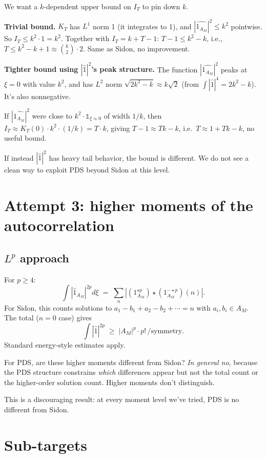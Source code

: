 \documentclass[11pt]{article}
\begin{document}
We want a $k$-dependent upper bound on $I_T$ to pin down $k$.

\textbf{Trivial bound.} $K_T$ has $L^1$ norm 1 (it integrates to 1), and
$|\widehat{1_{A_M}}|^2 \leq k^2$ pointwise. So $I_T \leq k^2 \cdot 1 = k^2$.
Together with $I_T = k + T - 1$: $T - 1 \leq k^2 - k$, i.e.,
$T \leq k^2 - k + 1 \approx \binom{k}{2}\cdot 2$. Same as Sidon, no
improvement.

\textbf{Tighter bound using $|\widehat{1}|^2$'s peak structure.} The
function $|\widehat{1_{A_M}}|^2$ peaks at $\xi = 0$ with value $k^2$,
and has $L^2$ norm $\sqrt{2k^2 - k} \approx k\sqrt 2$ (from
$\int |\widehat 1|^4 = 2k^2 - k$). It's also nonnegative.

If $|\widehat{1_{A_M}}|^2$ were close to $k^2 \cdot \mathbb{1}_{\xi \approx 0}$
of width $1/k$, then $I_T \approx K_T(0) \cdot k^2 \cdot (1/k)
= T \cdot k$, giving $T - 1 \approx Tk - k$, i.e.\ $T \approx 1 + Tk - k$,
no useful bound.

If instead $|\widehat 1|^2$ has heavy tail behavior, the bound is
different. We do not see a clean way to exploit PDS beyond Sidon at this
level.

\section{Attempt 3: higher moments of the autocorrelation}

\subsection{$L^p$ approach}

For $p \geq 4$:
\[
   \int |\widehat 1_{A_M}|^{2p} d\xi \;=\; \sum_n |(1_{A_M}^{\star p})\star(1_{A_M}^{-\star p})(n)|.
\]
For Sidon, this counts solutions to $a_1 - b_1 + a_2 - b_2 + \cdots = n$
with $a_i, b_i \in A_M$. The total ($n = 0$ case) gives
\[
   \int |\widehat 1|^{2p} \;\geq\; |A_M|^p \cdot p!\, / \text{symmetry}.
\]
Standard energy-style estimates apply.

For PDS, are these higher moments different from Sidon? \emph{In
general no}, because the PDS structure constrains \emph{which}
differences appear but not the total count or the higher-order solution
count. Higher moments don't distinguish.

This is a discouraging result: at every moment level we've tried, PDS
is no different from Sidon.

\section{Sub-targets}
\end{document}
